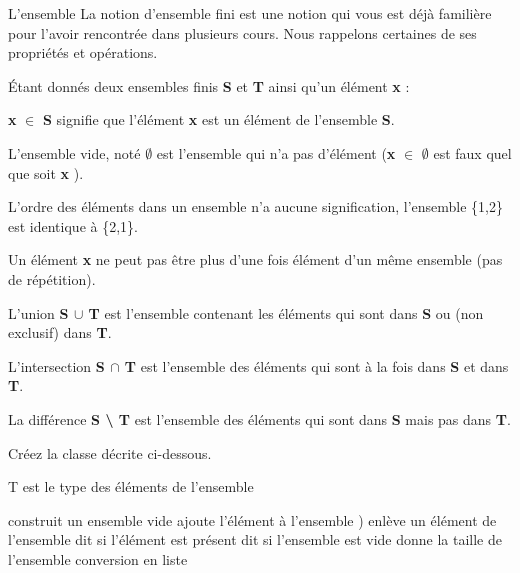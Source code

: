 \begin{Exercice}{L'ensemble}
		La notion d’ensemble fini est une notion qui vous est déjà 
		familière pour l’avoir rencontrée dans plusieurs cours. Nous rappelons
		certaines de ses propriétés et opérations. 
				
		Étant donnés deux ensembles
		finis \textbf{S} et \textbf{T} ainsi qu’un élément \textbf{x} :

		\begin{liste}
		\item 
			\textbf{x} {${\in}$} \textbf{S} signifie que l’élément \textbf{x}
			est un élément de l’ensemble \textbf{S}.
		\item 
			L’ensemble vide, noté \textbf{${\emptyset}$} 
			est l’ensemble qui n’a pas d’élément 
			(\textbf{x} {${\in}$} \textbf{${\emptyset}$} 
			est faux quel que soit \textbf{x} ).
		\item 
			L’ordre des éléments dans un ensemble n’a
			aucune signification, l’ensemble \{1,2\} est
			identique à \{2,1\}.
		\item 
			Un élément \textbf{x} ne peut
			pas être plus d’une fois élément d’un même ensemble 
			(pas de répétition).
		\item 
			L’union \textbf{S ${\cup}$ T} 
			est l’ensemble contenant les éléments qui sont dans 
			\textbf{S} ou (non exclusif) dans \textbf{T}.
		\item 
			L’intersection \textbf{S ${\cap}$ T} 
			est l’ensemble des éléments qui sont à la fois 
			dans \textbf{S} et dans \textbf{T}.
		\item 
			La différence \textbf{S {\textbackslash} T} 
			est l’ensemble des éléments qui sont 
			dans \textbf{S} mais pas dans \textbf{T}.
		\end{liste}
		
		Créez la classe 
		décrite ci-dessous.
		
		\begin{Pseudocode}
			\RComment T est le type des éléments de l'ensemble
			
				\Public
				\RComment construit un ensemble vide
				\RComment ajoute l'élément à l'ensemble
				)
				\RComment enlève un élément de l'ensemble
				\RComment dit si l'élément est présent
				\RComment dit si l'ensemble est vide
				\RComment donne la taille de l'ensemble
				\RComment conversion en liste
			\EndClass
		\end{Pseudocode}
		

\end{Exercice}
